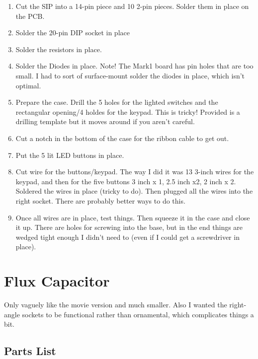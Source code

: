 \documentclass[11pt]{article}
\begin{document}
\begin{enumerate}
\item Cut the SIP into a 14-pin piece and 10 2-pin pieces.
	Solder them in place on the PCB.
\item Solder the 20-pin DIP socket in place
\item Solder the resistors in place.
\item Solder the Diodes in place.  Note!  The Mark1 board has
	pin holes that are too small.  I had to sort of surface-mount
	solder the diodes in place, which isn't optimal.
\item Prepare the case.  Drill the 5 holes for the lighted switches
	and the rectangular opening/4 holdes for the keypad.
	This is tricky!  Provided is a drilling template but
	it moves around if you aren't careful.
\item Cut a notch in the bottom of the case for the ribbon cable
	to get out.
\item Put the 5 lit LED buttons in place.
\item Cut wire for the buttons/keypad.  The way I did it was
	13 3-inch wires for the keypad, and then for the five buttons
	3 inch x 1, 2.5 inch x2, 2 inch x 2.  Soldered the wires in place
	(tricky to do).  Then plugged all the wires into the right socket.
	There are probably better ways to do this.
\item Once all wires are in place, test things.  Then squeeze it in the
	case and close it up.  There are holes for screwing into the
	base, but in the end things are wedged tight enough I didn't
	need to (even if I could get a screwdriver in place).

\end{enumerate}

\pagebreak
\section{Flux Capacitor}

Only vaguely like the movie version and much smaller.
Also I wanted the right-angle sockets to be functional rather
than ornamental, which complicates things a bit.

\subsection{Parts List}
\end{document}
